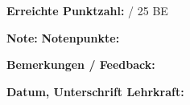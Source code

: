 \documentclass[11pt, a4paper]{article}
\begin{document}
\begin{tcolorbox}[colback=white, colframe=erfolg, boxrule=2pt]
\begin{center}
\large
\textbf{Erreichte Punktzahl:} \underline{\hspace{2cm}} / 25 BE

\vspace{0.8em}

\textbf{Note:} \underline{\hspace{2cm}} \hspace{2cm} \textbf{Notenpunkte:} \underline{\hspace{2cm}}
\end{center}
\end{tcolorbox}

\vspace{1em}


\textbf{Bemerkungen / Feedback:}

\vspace{0.5em}
\begin{tcolorbox}[colback=white, colframe=mittelgrau, boxrule=0.5pt, height=4cm]
\end{tcolorbox}

\vspace{1em}

\hfill \textbf{Datum, Unterschrift Lehrkraft:} \underline{\hspace{5cm}}
\end{document}
